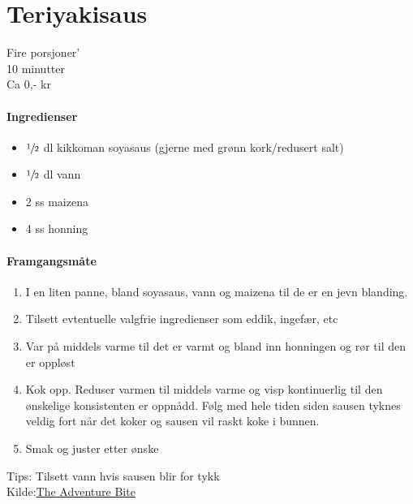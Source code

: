 \section{﻿Teriyakisaus}
\label{teriyaki}

Fire porsjoner'\\
10 minutter\\
Ca 0,- kr

\paragraph{Ingredienser}
\begin{itemize}[noitemsep]
	\item $\sfrac{1}{2}$ dl kikkoman soyasaus (gjerne med grønn kork/redusert salt)
	\item $\sfrac{1}{2}$ dl vann
	\item 2 ss maizena
	\item 4 ss honning
\end{itemize}

\paragraph{Framgangsmåte}
\begin{enumerate}[noitemsep]
	\item I en liten panne, bland soyasaus, vann og maizena til de er en jevn blanding.
	\item Tilsett evtentuelle valgfrie ingredienser som eddik, ingefær, etc
  \item Var på middels varme til det er varmt og bland inn honningen og rør til den er oppløst
  \item Kok opp. Reduser varmen til middels varme og visp kontinuerlig til den ønskelige konsistenten er oppnådd. Følg med hele tiden siden sausen tyknes veldig fort når det koker og sausen vil raskt koke i bunnen.
  \item Smak og juster etter ønske

\end{enumerate}

Tips:  Tilsett vann hvis sausen blir for tykk\\

Kilde:\href{http://theadventurebite.com/3-ingredient-easy-teriyaki-sauce-recipe/}{The Adventure Bite}
